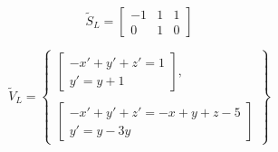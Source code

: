 \begin{center}
	\begin{minipage}{0.3\linewidth}
		\begin{equation*}
		\tilde{S}_L = 
			\begin{bmatrix}
				-1 & 1 & 1 \\
				0 & 1 & 0
			\end{bmatrix}
		\end{equation*}
	\end{minipage}
	\begin{minipage}{0.6\linewidth}
		\begin{equation*}
		    \tilde{V}_L =
		     \begin{Bmatrix}
		              \begin{bmatrix}
		                    -x' + y' + z' = 1 \\
		                    y' = y + 1
		               \end{bmatrix}, \\ \\
		               \begin{bmatrix}
		                     -x' + y' + z' = -x + y + z - 5 \\
		                    y' = y - 3y
		               \end{bmatrix}
		    \end{Bmatrix}
		\end{equation*}
	\end{minipage}
\end{center}
